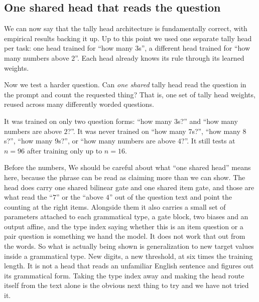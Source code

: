 \documentclass[10pt]{article}
\theoremstyle{definition}
\begin{document}
\subsection{One shared head that reads the question}
\label{sec:shared}

We can now say that the tally head architecture is fundamentally correct,
with empirical results backing it up. Up to this point we used one
separate tally head per task: one head trained for ``how many $3$s'', a
different head trained for ``how many numbers above $2$''. Each head
already knows its rule through its learned weights.

Now we test a harder question. Can \emph{one shared} tally head read the
question in the prompt and count the requested thing? That is, one set of
tally head weights, reused across many differently worded questions.

It was trained on only two question forms: ``how many $3$s?'' and ``how
many numbers are above $2$?''. It was never trained on ``how many $7$s?'',
``how many $8$s?'', ``how many $9$s?'', or ``how many numbers are above
$4$?''. It still tests at $n = 96$ after training only up to $n = 16$.

Before the numbers, We should be careful about what ``one shared head''
means here, because the phrase can be read as claiming more than we can show. The head does carry one shared bilinear gate and one shared item
gate, and those are what read the ``$7$'' or the ``above $4$'' out of the
question text and point the counting at the right items. Alongside them it
also carries a small set of parameters attached to each grammatical type,
a gate block, two biases and an output affine, and the type index saying
whether this is an item question or a pair question is something we hand the model. It does not work that out from the words. So what is
actually being shown is generalization to new target values inside a
grammatical type. New digits, a new threshold, at six times the training
length. It is not a head that reads an unfamiliar English sentence and
figures out its grammatical form. Taking the type index away and making the
head route itself from the text alone is the obvious next thing to try and we have not tried it.
\end{document}
